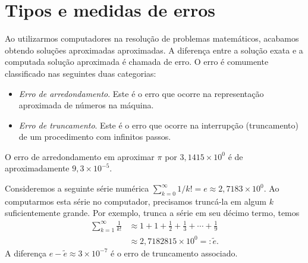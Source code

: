 
\section{Tipos e medidas de erros}\label{cap_aritm_sec_erros}

Ao utilizarmos computadores na resolução de problemas matemáticos, acabamos obtendo soluções aproximadas aproximadas. A diferença entre a solução exata e a computada solução aproximada é chamada de erro. O erro é comumente classificado nas seguintes duas categorias:
\begin{itemize}
\item \emph{Erro de arredondamento}. Este é o erro que ocorre na representação aproximada de números na máquina.
\item \emph{Erro de truncamento}. Este é o erro que ocorre na interrupção (truncamento) de um procedimento com infinitos passos.
\end{itemize}

\begin{ex}\label{ex:erro_de_arredondamento}
  O erro de arredondamento em aproximar $\pi$ por $3,1415\times 10^0$ é de aproximadamente $9,3\times 10^{-5}$.
\end{ex}

\begin{ex}\label{ex:erro_de_truncamento}
  Consideremos a seguinte série numérica $\sum_{k=0}^\infty 1/k! = e \approx 2,7183\times 10^0$. Ao computarmos esta série no computador, precisamos truncá-la em algum $k$ suficientemente grande. Por exemplo, trunca a série em seu décimo termo, temos
  \begin{align}
    \sum_{k=1}^\infty \frac{1}{k!} &\approx 1 + 1 + \frac{1}{2} + \frac{1}{3} + \cdots + \frac{1}{9} \\
    &\approx 2,7182815\times 10^0 =: \tilde{e}.
  \end{align}
A diferença $e - \tilde{e} \approx 3\times 10^{-7}$ é o erro de truncamento associado.
\end{ex}

